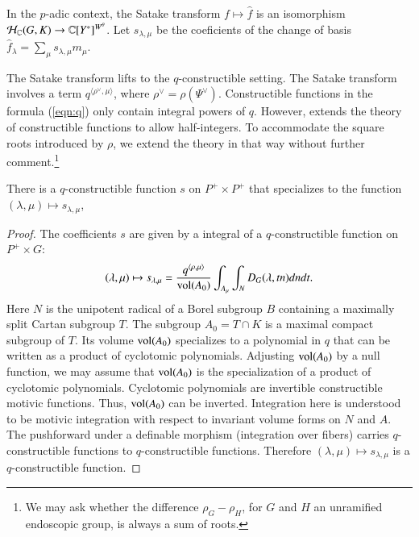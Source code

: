 

In the $p$-adic context, the Satake transform $f\mapsto \hat f$
is an isomorphism  $\mathcal H_{\mathbb{C}}(G,K)\to\mathbb{C}[Y^*]^{W^\theta}$.
Let $s_{\lambda,\mu}$ be the coeficients of the change of basis $\hat f_\lambda = \sum_\mu s_{\lambda,\mu} m_\mu$.

The Satake transform lifts to the $q$-constructible setting.  The Satake transform involves
a term $q^{\langle\rho^\vee,\mu\rangle}$, where $\rho^\vee = \rho(\Psi^\vee)$.   Constructible functions
in the formula (\ref{eqn:q})  only contain integral powers of $q$.  However, \cite[\S B.3.1]{cluckers2011local} 
extends the theory of constructible functions to allow half-integers.  To accommodate the square roots introduced by $\rho$,
we extend
the theory in that way without further comment.\footnote{We may ask whether the difference $\rho_G - \rho_H$,
for $G$ and $H$ an unramified endoscopic group, is always a sum of roots.}

\begin{lemma}\label{lemma:satake} There is a $q$-constructible function $s$ on $P^+\times P^+$ that
specializes to the function $(\lambda,\mu)\mapsto s_{\lambda,\mu}$,
\end{lemma}

\begin{proof} 
The coefficients $s$ are given by a integral of a $q$-constructible function on $P^+\times G$:
\begin{equation}\label{eqn:s}
(\lambda,\mu)\mapsto s_{\lambda,\mu}=\frac{q^{\langle\rho,\mu\rangle}}{{\operatorname{vol}}(A_0)} \int_{A_\mu} \int_N D_G(\lambda,t n) dn dt.
\end{equation}
Here $N$ is the unipotent radical of a Borel subgroup $B$ containing a maximally split Cartan subgroup
$T$.  The subgroup $A_0 = T\cap K$ is a maximal compact subgroup of $T$.  Its volume ${\operatorname{vol}}(A_0)$ specializes
to a polynomial in $q$ that can be written as a product of cyclotomic polynomials.  Adjusting ${\operatorname{vol}}(A_0)$ by a 
null function, we may assume that ${\operatorname{vol}}(A_0)$ is the specialization of a product of cyclotomic polynomials.
Cyclotomic polynomials are invertible constructible motivic functions.  Thus, ${\operatorname{vol}}(A_0)$ can be inverted.
  Integration here is understood to be motivic integration with respect to invariant volume forms on $N$ and $A$.
The pushforward under a definable morphism (integration over fibers) carries $q$-constructible functions
to $q$-constructible functions.
Therefore $(\lambda,\mu)\mapsto s_{\lambda,\mu}$ is a $q$-constructible function.
\end{proof}


